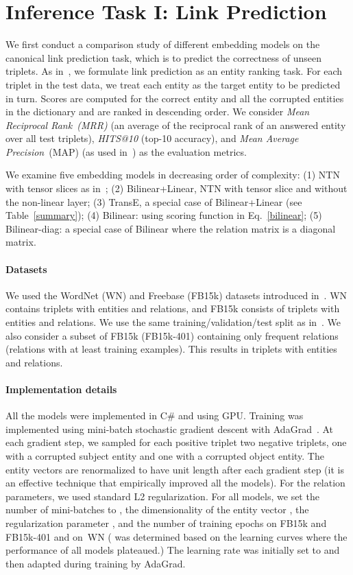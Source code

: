 \documentclass{article} \usepackage{iclr2015,times}
\begin{document}
\section{Inference Task I: Link Prediction}
\label{sec:link_prediction}
We first conduct a comparison study of different embedding models on the canonical link prediction task, which is to predict the correctness of unseen triplets. As in~\citep{BordesUsGaWeYa2013}, we formulate link prediction as an entity ranking task. For each triplet in the test data, we treat each entity as the target entity to be predicted in turn. Scores are computed for the correct entity and all the corrupted entities in the dictionary and are ranked in descending order. We consider \textit{Mean Reciprocal Rank~(MRR)} (an average of the reciprocal rank of an answered entity over all test triplets), \textit{HITS@10} (top-10 accuracy), and \textit{Mean Average Precision}~(MAP) (as used in~\citep{CYYM14}) as the evaluation metrics.

We examine five embedding models in decreasing order of complexity: (1) NTN with  tensor slices as in~\citep{SocherChenManningNg2013}; (2) Bilinear+Linear, NTN with  tensor slice and without the non-linear layer; (3) TransE, a special case of Bilinear+Linear (see Table~\ref{summary}); (4) Bilinear: using scoring function in Eq.~\eqref{bilinear}; (5) Bilinear-diag: a special case of Bilinear where the relation matrix is a diagonal matrix.

\paragraph{Datasets} We used the WordNet (WN) and Freebase (FB15k) datasets introduced in~\citep{BordesUsGaWeYa2013}. WN contains  triplets with  entities and  relations, and FB15k consists of  triplets with  entities and  relations. We use the same training/validation/test split as in~\citep{BordesUsGaWeYa2013}. We also consider a subset of FB15k (FB15k-401) containing only frequent relations (relations with at least  training examples). This results in  triplets with  entities and  relations.  

\paragraph{Implementation details} All the models were implemented in C\# and using GPU. Training was implemented using mini-batch stochastic gradient descent with AdaGrad~\citep{duchi2011adaptive}. At each gradient step, we sampled for each positive triplet two negative triplets, one with a corrupted subject entity and one with a corrupted object entity. The entity vectors are renormalized to have unit length after each gradient step (it is an effective technique that empirically improved all the models). For the relation parameters, we used standard L2 regularization. For all models, we set the number of mini-batches to , the dimensionality of the entity vector , the regularization parameter , and the number of training epochs  on FB15k and FB15k-401 and  on~WN ( was determined based on the learning curves where the performance of all models plateaued.) The learning rate was initially set to  and then adapted during training by AdaGrad. 
\end{document}
